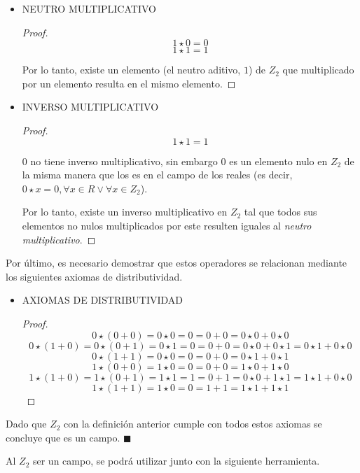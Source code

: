 \documentclass{article}
\begin{document}
\begin{itemize}
\begin{proof}
Por lo tanto, los elementos de la multiplicación en $Z_2$ son asociativos.
\end{proof}

    \item NEUTRO MULTIPLICATIVO
\begin{proof}
$$
1 \star 0 = 0
$$$$
1 \star 1 = 1
$$

Por lo tanto, existe un elemento (el neutro aditivo, $1$) de $Z_2$ que multiplicado por un elemento resulta en el mismo elemento.
\end{proof}

    \item INVERSO MULTIPLICATIVO
\begin{proof}
$$
1 \star 1 = 1
$$

$0$ no tiene inverso multiplicativo, sin embargo $0$ es un elemento nulo en $Z_2$ de la misma manera que los es en el campo de los reales (es decir, $0 \star x = 0, \forall x \in R \lor \forall x \in Z_2$).

Por lo tanto, existe un inverso multiplicativo en $Z_2$ tal que todos sus elementos no nulos multiplicados por este resulten iguales al \textit{neutro multiplicativo}.
\end{proof}
\end{itemize}

Por último, es necesario demostrar que estos operadores se relacionan mediante los siguientes axiomas de distributividad.

\begin{itemize}
    \item AXIOMAS DE DISTRIBUTIVIDAD

\begin{proof}
$$
0 \star ( 0 + 0 ) = 0 \star 0 = 0 = 0 + 0 = 0 \star 0 + 0 \star 0
$$$$
0 \star (1 + 0) = 0 \star ( 0 + 1 ) = 0 \star 1 = 0 = 0 + 0 = 0 \star 0 + 0 \star 1 = 0 \star 1 + 0 \star 0
$$$$
0 \star ( 1 + 1 ) = 0 \star 0 = 0 = 0 + 0 = 0 \star 1 + 0 \star 1
$$$$
1 \star ( 0 + 0 ) = 1 \star 0 = 0 = 0 + 0 = 1 \star 0 + 1 \star 0
$$$$
1 \star (1 + 0) = 1 \star ( 0 + 1 ) = 1 \star 1 = 1 = 0 + 1 = 0 \star 0 + 1 \star 1 = 1 \star 1 + 0 \star 0
$$$$
1 \star ( 1 + 1 ) = 1 \star 0 = 0 = 1 + 1 = 1 \star 1 + 1 \star 1
$$
\end{proof}

\end{itemize}

Dado que $Z_2$ con la definición anterior cumple con todos estos axiomas se concluye que es un campo. $\blacksquare$

Al $Z_2$ ser un campo, se podrá utilizar junto con la siguiente herramienta.
\end{document}
